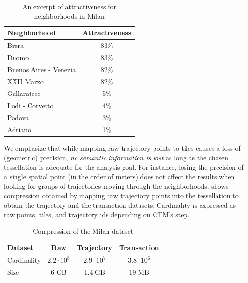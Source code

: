 \documentclass[preprint,12pt,authoryear]{elsarticle} %
\renewcommand{\sf}[1]{\textsf{\textup{#1}}}
\begin{document}
\begin{table}[t]
    \centering
    \footnotesize
    \caption{An excerpt of attractiveness for neighborhoods in \sf{Milan}}
    \label{tbl:att}
    \begin{tabular}{lc}
    \toprule
        Neighborhood & Attractiveness \\
        \midrule
        Brera & 83\% \\ 
        Duomo & 83\% \\ 
        Buenos Aires - Venezia & 82\% \\ 
        XXII Marzo & 82\% \\
        Gallaratese & 5\% \\ 
        Lodi - Corvetto & 4\% \\ 
        Padova & 3\% \\
        Adriano & 1\% \\ \bottomrule
    \end{tabular}
\end{table}

We emphasize that while mapping raw trajectory points to tiles causes a loss of (geometric) precision, \textit{no semantic information is lost} as long as the chosen tessellation is adequate for the analysis goal.
For instance, losing the precision of a single spatial point (in the order of meters) does not affect the results when looking for groups of trajectories moving through the neighborhoods.
 shows compression obtained by mapping raw trajectory points into the tessellation to obtain the trajectory and the transaction datasets.
Cardinality is expressed as raw points, tiles, and trajectory ids depending on CTM's step.

\begin{table}[t]
\centering
\footnotesize
\caption{Compression of the \sf{Milan} dataset}
\label{tab:comp}
\begin{tabular}{lccc}
\toprule
Dataset     & Raw              & Trajectory       & Transaction\\
\midrule
Cardinality & $2.2 \cdot 10^8$ & $2.9 \cdot 10^7$ & $3.8 \cdot 10^6$\\
Size        & 6 GB              & 1.4 GB            & 19 MB            \\
\bottomrule
\end{tabular}
\end{table}
\end{document}
